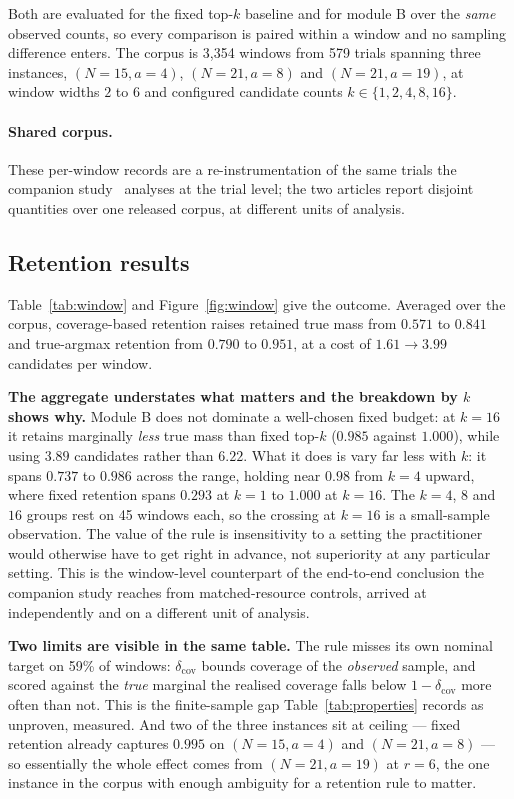 \documentclass[final,5p,times,longtitle]{elsarticle}
\newcommand{\dcov}{\delta_{\mathrm{cov}}}
\begin{document}
Both are evaluated for the fixed top-$k$ baseline and for module B over the
\emph{same} observed counts, so every comparison is paired within a window
and no sampling difference enters. The corpus is 3{,}354 windows from 579
trials spanning three instances, $(N{=}15,a{=}4)$, $(N{=}21,a{=}8)$ and
$(N{=}21,a{=}19)$, at window widths $2$ to $6$ and configured candidate
counts $k\in\{1,2,4,8,16\}$.

\paragraph{Shared corpus.} These per-window records are a re-instrumentation
of the same trials the companion study~\cite{companion} analyses at the
trial level; the two articles report disjoint quantities over one released
corpus, at different units of analysis.

\subsection{Retention results}
\label{sec:wresults}

Table~\ref{tab:window} and Figure~\ref{fig:window} give the outcome.
Averaged over the corpus, coverage-based retention raises retained true
mass from $0.571$ to $0.841$ and true-argmax retention from $0.790$ to
$0.951$, at a cost of $1.61\to3.99$ candidates per window.

\textbf{The aggregate understates what matters and the breakdown by $k$
shows why.} Module B does not dominate a well-chosen fixed budget: at
$k=16$ it retains marginally \emph{less} true mass than fixed top-$k$
($0.985$ against $1.000$), while using $3.89$ candidates rather than
$6.22$. What it does is vary far less with $k$: it spans $0.737$ to
$0.986$ across the range, holding near $0.98$ from $k=4$ upward, where
fixed retention spans $0.293$ at $k=1$ to $1.000$ at $k=16$. The $k=4$,
$8$ and $16$ groups rest on 45 windows each, so the crossing at $k=16$ is
a small-sample observation. The value of
the rule is insensitivity to a setting the practitioner would otherwise
have to get right in advance, not superiority at any particular setting.
This is the window-level counterpart of the end-to-end conclusion the
companion study reaches from matched-resource controls, arrived at
independently and on a different unit of analysis.

\textbf{Two limits are visible in the same table.} The rule misses its own
nominal target on 59\% of windows: $\dcov$ bounds coverage of the
\emph{observed} sample, and scored against the \emph{true} marginal the
realised coverage falls below $1-\dcov$ more often than not. This is the
finite-sample gap Table~\ref{tab:properties} records as unproven, measured.
And two of the three instances sit at ceiling --- fixed retention already
captures $0.995$ on $(N{=}15,a{=}4)$ and $(N{=}21,a{=}8)$ --- so
essentially the whole effect comes from $(N{=}21,a{=}19)$ at $r=6$, the one
instance in the corpus with enough ambiguity for a retention rule to
matter.
\end{document}
